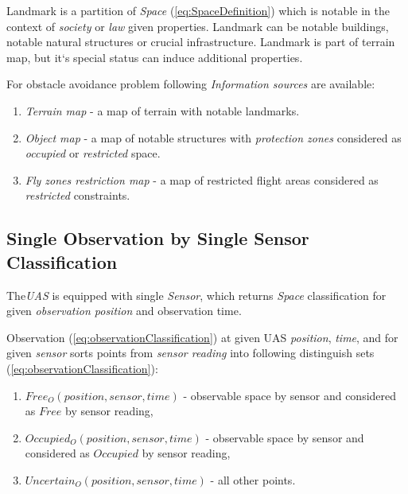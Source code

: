     \begin{definition}{Landmark}\label{def:Landmark} 
        is a partition of \emph{Space} (\ref{eq:SpaceDefinition}) which is notable in the context of \emph{society} or \emph{law} given properties. Landmark can be notable buildings, notable natural structures or crucial infrastructure. Landmark is part of terrain map, but it`s special status can induce additional properties.
    \end{definition}

    \noindent For obstacle avoidance problem following \emph{Information sources} are available:
    
    \begin{enumerate}
        \item\emph{Terrain map} - a map of terrain with notable landmarks.
        
        \item\emph{Object map} - a map of notable structures with \emph{protection zones} considered as \emph{occupied} or \emph{restricted} space.
        
        \item\emph{Fly zones restriction map} - a map of restricted flight areas considered as \emph{restricted} constraints.
    \end{enumerate}

\subsection{Single Observation by Single Sensor Classification} \label{singleObservationSingle sensor}
    \noindent The\emph{UAS} is equipped with single \emph{Sensor}, which returns \emph{Space} classification for given \emph{observation position} and observation time.


    Observation (\ref{eq:observationClassification}) at given UAS \emph{position}, \emph{time}, and for given \emph{sensor} sorts points from \emph{sensor reading} into following distinguish sets (\ref{eq:observationClassification}):
    
    \begin{enumerate}
        \item $Free_O(position,sensor,time)$ - observable space by sensor and considered as $Free$ by sensor reading,
        \item $Occupied_O(position,sensor,time)$ -  observable space by sensor and considered as $Occupied$ by sensor reading,
        \item $Uncertain_O(position,sensor,time)$ - all other points.
    \end{enumerate}
    
